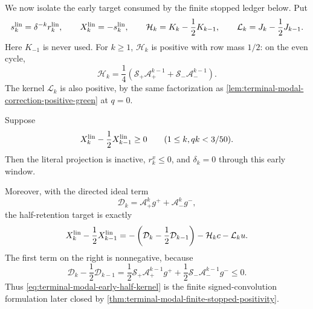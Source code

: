 We now isolate the early target consumed by the finite stopped ledger below.
Put
\begin{equation}
 s_k^{\rm lin}=\delta^{-k}r_k^{\rm lin},
 \qquad X_k^{\rm lin}=-s_k^{\rm lin},
 \qquad
 \mathcal H_k=K_k-\frac12K_{k-1},
 \qquad
 \mathcal L_k=J_k-\frac12J_{k-1}.
 \label{eq:terminal-modal-half-retention-data}
\end{equation}
Here $K_{-1}$ is never used.  For $k\ge1$, $\mathcal H_k$ is positive with
row mass $1/2$: on the even cycle,
\[
 \mathcal H_k=\frac14\left(
  \mathcal S_+\mathcal A_+^{k-1}
 +\mathcal S_-\mathcal A_-^{k-1}\right).
\]
The kernel $\mathcal L_k$ is also positive, by the same factorization as
\cref{lem:terminal-modal-correction-positive-green} at $q=0$.

\begin{lemma}
\label{lem:terminal-modal-early-half-interface}
Suppose
\begin{equation}
 X_k^{\rm lin}-\frac12X_{k-1}^{\rm lin}\ge0
 \qquad(1\le k, qk<3/50).
 \label{eq:terminal-modal-early-half-retention}
\end{equation}
Then the literal projection is inactive, $r_k^x\le0$, and $\delta_k=0$
through this early window.

Moreover, with the directed ideal term
\begin{equation}
 \mathcal D_k=\mathcal A_+^kg^++\mathcal A_-^kg^-,
\end{equation}
the half-retention target is exactly
\begin{equation}
 X_k^{\rm lin}-\frac12X_{k-1}^{\rm lin}
 =-\left(\mathcal D_k-\frac12\mathcal D_{k-1}\right)
  -\mathcal H_kc-\mathcal L_ku.
 \label{eq:terminal-modal-early-half-kernel}
\end{equation}
The first term on the right is nonnegative, because
\[
 \mathcal D_k-\frac12\mathcal D_{k-1}
 =\frac12\mathcal S_+\mathcal A_+^{k-1}g^+
 +\frac12\mathcal S_-\mathcal A_-^{k-1}g^-\le0.
\]
Thus \eqref{eq:terminal-modal-early-half-kernel} is the finite
signed-convolution formulation later closed by
\cref{thm:terminal-modal-finite-stopped-positivity}.
\end{lemma}

